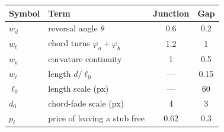 \begin{tabular}{llcc}
\toprule
Symbol & Term & Junction & Gap \\
\midrule
$w_d$ & reversal angle $\theta$ & 0.6 & 0.2 \\
$w_t$ & chord turns $\varphi_a+\varphi_b$ & 1.2 & 1 \\
$w_\kappa$ & curvature continuity & 1 & 0.5 \\
$w_\ell$ & length $d/\ell_0$ & --- & 0.15 \\
$\ell_0$ & length scale (px) & --- & 60 \\
$d_0$ & chord-fade scale (px) & 4 & 3 \\
$p_i$ & price of leaving a stub free & 0.62 & 0.3 \\
\bottomrule
\end{tabular}
